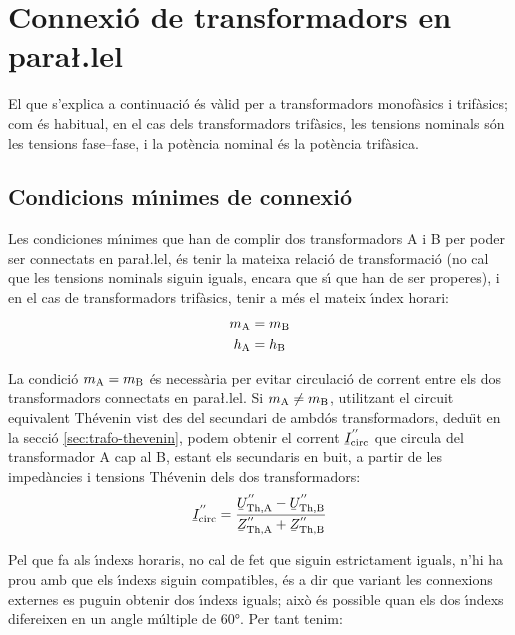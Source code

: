 \section{\texorpdfstring{Connexi\'{o} de transformadors en para{\l.l}el}{Connexi\'{o} de transformadors en paral-lel}}

El que s'explica a continuaci\'{o} \'{e}s v\`{a}lid per a transformadors
monof\`{a}sics i trif\`{a}sics; com \'{e}s habitual, en el cas dels
transformadors trif\`{a}sics, les tensions nominals s\'{o}n les tensions
fase--fase, i la pot\`{e}ncia nominal \'{e}s la pot\`{e}ncia trif\`{a}sica.

\subsection{Condicions m\'{\i}nimes de connexi\'{o}}

Les condiciones m\'{\i}nimes que han de complir dos transformadors A i B per poder ser connectats en para{\l.l}el, \'{e}s tenir la mateixa relaci\'{o} de transformaci\'{o} (no cal que les tensions nominals siguin iguals, encara que s\'{\i} que han de ser properes), i en el cas de transformadors trif\`{a}sics, tenir a m\'{e}s el mateix \'{\i}ndex horari:
\begin{align}
    m_\mathrm{A} &= m_\mathrm{B}\\
    h_\mathrm{A} &= h_\mathrm{B}
\end{align}

La condici\'{o} $m_\mathrm{A} = m_\mathrm{B}$ \'{e}s necess\`{a}ria per evitar circulaci\'{o} de corrent entre els dos transformadors connectats en para{\l.l}el. Si $m_\mathrm{A} \neq m_\mathrm{B}$, utilitzant el circuit equivalent  Th\'{e}venin vist des del secundari de ambd\'{o}s transformadors, dedu\"{\i}t en la secci\'{o} \vref{sec:trafo-thevenin}, podem obtenir el corrent $\cmplx{I}\ped{circ}^{''}$ que circula del transformador A cap al B, estant els secundaris en buit, a partir de les imped\`{a}ncies i tensions Th\'{e}venin dels dos transformadors:
\begin{equation}
    \cmplx{I}\ped{circ}^{''} = \frac{\cmplx{U}\ped{Th,A}^{''}-\cmplx{U}\ped{Th,B}^{''}}{\cmplx{Z}\ped{Th,A}^{''}+\cmplx{Z}\ped{Th,B}^{''}}
\end{equation}

Pel que fa als \'{\i}ndexs horaris, no cal de fet que siguin estrictament iguals, n'hi ha prou amb que els \'{\i}ndexs siguin compatibles, \'{e}s a dir que variant les connexions externes es puguin obtenir dos \'{\i}ndexs iguals; aix\`{o} \'{e}s possible quan els dos \'{\i}ndexs difereixen en un angle m\'{u}ltiple de \ang{60}. Per tant tenim:

